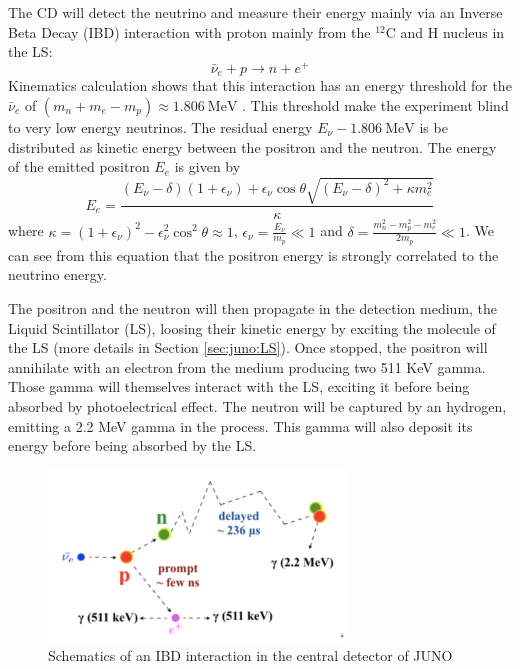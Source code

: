 \documentclass[../main.tex]{subfiles}
\begin{document}
The CD will detect the neutrino and measure their energy mainly via an Inverse Beta Decay (IBD) interaction with proton mainly from the $^{12}$C and H nucleus in the LS:
\begin{equation*}
  \bar{\nu}_e + p \rightarrow n + e^+
\end{equation*}
Kinematics calculation shows that this interaction has an energy threshold for the $\bar{\nu}_e$ of $ (m_n + m_e - m_p ) \approx 1.806 ~ \mathrm{MeV}$ \cite{strumia_precise_2003}.
This threshold make the experiment blind to very low energy neutrinos. The residual energy $E_{\nu} - 1.806 ~ \mathrm{MeV}$ is be distributed as kinetic energy between the positron and the neutron.
The energy of the emitted positron $E_e$ is given by \cite{strumia_precise_2003}
\begin{equation}
  E_e = \frac{(E_\nu - \delta)(1+\epsilon_\nu) + \epsilon_\nu \cos \theta \sqrt{(E_\nu - \delta)^2 + \kappa m_e^2}}{\kappa}
\end{equation}
where $\kappa = (1 + \epsilon_\nu)^2 - \epsilon_\nu^2 \cos^2 \theta \approx 1$, $\epsilon_\nu = \frac{E_\nu}{m_p} \ll 1$ and $\delta = \frac{m_n^2 - m_p^2 - m_e^2}{2m_p} \ll 1$.
We can see from this equation that the positron energy is strongly correlated to the neutrino energy.


The positron and the neutron will then propagate in the detection medium, the Liquid Scintillator (LS), loosing their kinetic energy by exciting the molecule of the LS (more details in Section \ref{sec:juno:LS}). Once stopped, the positron will annihilate with an electron from the medium producing two 511 KeV gamma. Those gamma will themselves interact with the LS, exciting it before being absorbed by photoelectrical effect. The neutron will be captured by an hydrogen, emitting a 2.2 MeV gamma in the process. This gamma will also deposit its energy before being absorbed by the LS.

\begin{figure}[ht]
  \centering
  \includegraphics[width=8cm]{images/juno/IDB-JUNO.png}
  \caption{Schematics of an IBD interaction in the central detector of JUNO}
  \label{fig:juno:IBD}
\end{figure}
\end{document}
